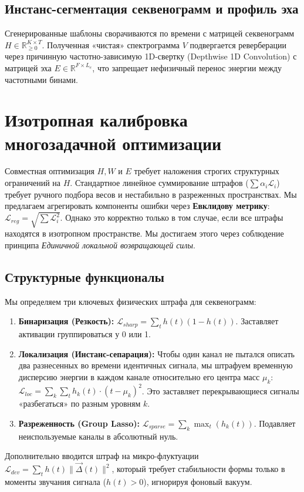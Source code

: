 \documentclass[11pt,a4paper]{article}
\begin{document}
\subsection{Инстанс-сегментация секвенограмм и профиль эха}
Сгенерированные шаблоны сворачиваются по времени с матрицей секвенограмм $H \in \mathbb{R}_{\ge 0}^{K \times T}$. Полученная «чистая» спектрограмма $V$ подвергается реверберации через причинную частотно-зависимую 1D-свертку (Depthwise 1D Convolution) с матрицей эха $E \in \mathbb{R}^{F \times L_e}$, что запрещает нефизичный перенос энергии между частотными бинами.

\section{Изотропная калибровка многозадачной оптимизации}

Совместная оптимизация $H, W$ и $E$ требует наложения строгих структурных ограничений на $H$. Стандартное линейное суммирование штрафов ($\sum \alpha_i \mathcal{L}_i$) требует ручного подбора весов и нестабильно в разреженных пространствах. Мы предлагаем агрегировать компоненты ошибки через \textbf{Евклидову метрику}: $\mathcal{L}_{reg} = \sqrt{\sum \mathcal{L}_i^2}$. 
Однако это корректно только в том случае, если все штрафы находятся в изотропном пространстве. Мы достигаем этого через соблюдение принципа \textit{Единичной локальной возвращающей силы}.

\subsection{Структурные функционалы}
Мы определяем три ключевых физических штрафа для секвенограмм:
\begin{enumerate}
    \item \textbf{Бинаризация (Резкость):} $\mathcal{L}_{sharp} = \sum_t h(t)(1 - h(t))$. Заставляет активации группироваться у 0 или 1.
    \item \textbf{Локализация (Инстанс-сепарация):} Чтобы один канал не пытался описать два разнесенных во времени идентичных сигнала, мы штрафуем временную дисперсию энергии в каждом канале относительно его центра масс $\mu_k$:
    $\mathcal{L}_{loc} = \sum_k \sum_t h_k(t) \cdot (t - \mu_k)^2$. Это заставляет перекрывающиеся сигналы «разбегаться» по разным уровням $k$.
    \item \textbf{Разреженность (Group Lasso):} $\mathcal{L}_{sparse} = \sum_k \max_t (h_k(t))$. Подавляет неиспользуемые каналы в абсолютный нуль.
\end{enumerate}
Дополнительно вводится штраф на микро-флуктуации $\mathcal{L}_{dev} = \sum_t h(t) \|\vec{\Delta}(t)\|^2$, который требует стабильности формы только в моменты звучания сигнала ($h(t)>0$), игнорируя фоновый вакуум.
\end{document}
